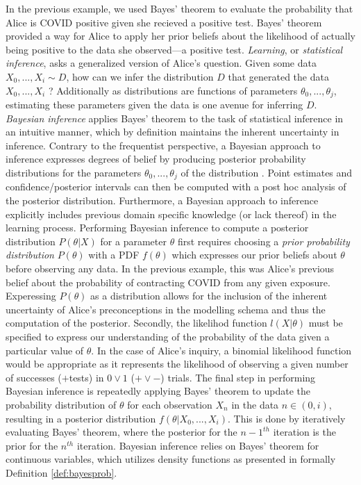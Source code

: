 \documentclass[
  12pt,
]{book}
\theoremstyle{definition}
\theoremstyle{definition}
\theoremstyle{definition}
\theoremstyle{remark}
\begin{document}
In the previous example, we used Bayes' theorem to evaluate the probability that Alice is COVID positive given she recieved a positive test.
Bayes' theorem provided a way for Alice to apply her prior beliefs about the likelihood of actually being positive to the data she observed---a positive test.
\emph{Learning}, or \emph{statistical inference}, asks a generalized version of Alice's question.
Given some data \(X_0,...,X_i \sim D\), how can we infer the distribution \(D\) that generated the data \(X_0,...,X_i\) \citep[  6.1]{Wasserman2004}?
Additionally as distributions are functions of parameters \(\theta_0, ..., \theta_j\), estimating these parameters given the data is one avenue for inferring \(D\).
\emph{Bayesian inference} applies Bayes' theorem to the task of statistical inference in an intuitive manner, which by definition maintains the inherent uncertainty in inference.
Contrary to the frequentist perspective, a Bayesian approach to inference expresses degrees of belief by producing posterior probability distributions for the parameters \(\theta_0, ..., \theta_j\) of the distribution \citep[  11.1]{Wasserman2004}.
Point estimates and confidence/posterior intervals can then be computed with a post hoc analysis of the posterior distribution.
Furthermore, a Bayesian approach to inference explicitly includes previous domain specific knowledge (or lack thereof) in the learning process.
Performing Bayesian inference to compute a posterior distribution \(P(\theta|X)\) for a parameter \(\theta\) first requires choosing a \emph{prior probability distribution} \(P(\theta)\) with a PDF \(f(\theta)\) which expresses our prior beliefs about \(\theta\) before observing any data.
In the previous example, this was Alice's previous belief about the probability of contracting COVID from any given exposure.
Experessing \(P(\theta)\) as a distribution allows for the inclusion of the inherent uncertainty of Alice's preconceptions in the modelling schema and thus the computation of the posterior.
Secondly, the likelihod function \(l(X|\theta)\) must be specified to express our understanding of the probability of the data given a particular value of \(\theta\).
In the case of Alice's inquiry, a binomial likelihood function would be appropriate as it represents the likelihood of observing a given number of successes (\(+\)tests) in \(0 \lor 1\) (\(+ \lor -\)) trials.
The final step in performing Bayesian inference is repeatedly applying Bayes' theorem to update the probability distribution of \(\theta\) for each observation \(X_n\) in the data \(n \in (0,i)\), resulting in a posterior distribution \(f(\theta|X_0,...,X_i)\).
This is done by iteratively evaluating Bayes' theorem, where the posterior for the \(n-1^{th}\) iteration is the prior for the \(n^{th}\) iteration.
Bayesian inference relies on Bayes' theorem for continuous variables, which utilizes density functions as presented in formally Definition \ref{def:bayesprob}.
\end{document}

